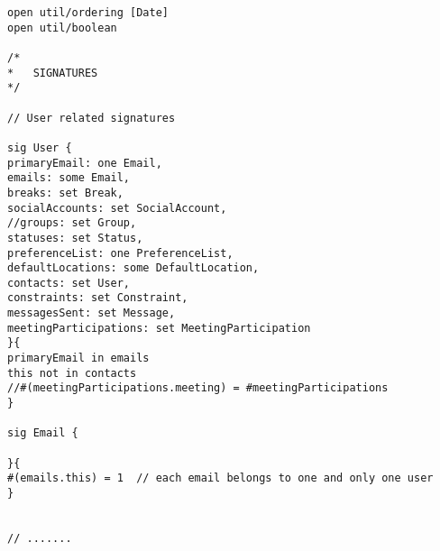 

\begin{lstlisting}[style=alloy]
open util/ordering [Date]
open util/boolean

/*
*	SIGNATURES
*/

// User related signatures

sig User {
primaryEmail: one Email,
emails: some Email,
breaks: set Break,
socialAccounts: set SocialAccount,
//groups: set Group,
statuses: set Status,
preferenceList: one PreferenceList,
defaultLocations: some DefaultLocation,
contacts: set User,
constraints: set Constraint,
messagesSent: set Message,
meetingParticipations: set MeetingParticipation
}{
primaryEmail in emails
this not in contacts
//#(meetingParticipations.meeting) = #meetingParticipations
}

sig Email {

}{
#(emails.this) = 1	// each email belongs to one and only one user
}


// .......\end{lstlisting}